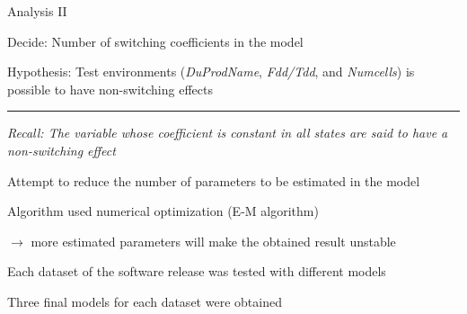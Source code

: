 \documentclass{beamer}
\begin{document}
\begin{frame}[fragile]
Analysis II

Decide: Number of switching coefficients in the model

Hypothesis: Test environments (\textit{DuProdName}, \textit{Fdd/Tdd}, and \textit{Numcells}) is possible to have non-switching effects
\rule{\textwidth}{0.4pt}

\begin{itemize}
	\item \small{\textit{Recall: The variable whose coefficient is \textit{constant} in all states are said to have a non-switching effect}}
	
	\item \normalsize{Attempt to reduce the number of parameters to be estimated in the model
	\item Algorithm used numerical optimization (E-M algorithm)
	
	$\rightarrow$ more estimated parameters will make the obtained result unstable 
	
	\item Each dataset of the software release was tested with different models
	\item Three final models for each dataset were obtained}
\end{itemize}

\end{frame}
\end{document}
